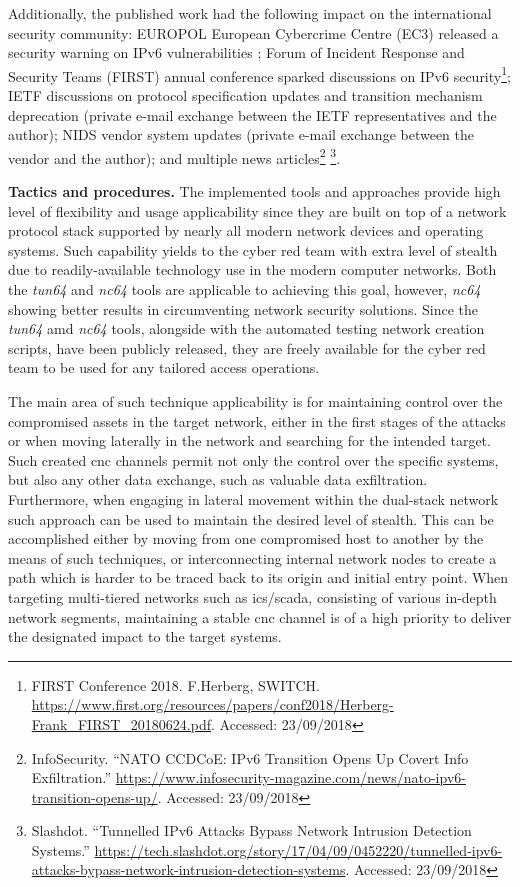 Additionally, the published work had the following impact on the international security community:
EUROPOL European Cybercrime Centre (EC3) released a security warning on IPv6 vulnerabilities \cite{EC3-2017-7};
Forum of Incident Response and Security Teams (FIRST) annual conference sparked discussions on IPv6 security\footnote{FIRST Conference 2018. F.Herberg, SWITCH. \url{https://www.first.org/resources/papers/conf2018/Herberg-Frank_FIRST_20180624.pdf}. Accessed: 23/09/2018};
IETF discussions on protocol specification updates and transition mechanism deprecation (private e-mail exchange between the IETF representatives and the author);
NIDS vendor system updates (private e-mail exchange between the vendor and the author);
and multiple news articles\footnote{InfoSecurity. ``NATO CCDCoE: IPv6 Transition Opens Up Covert Info Exfiltration.'' \url{https://www.infosecurity-magazine.com/news/nato-ipv6-transition-opens-up/}. Accessed: 23/09/2018} \footnote{Slashdot. ``Tunnelled IPv6 Attacks Bypass Network Intrusion Detection Systems.'' \url{https://tech.slashdot.org/story/17/04/09/0452220/tunnelled-ipv6-attacks-bypass-network-intrusion-detection-systems}. Accessed: 23/09/2018}.

\textbf{Tactics and procedures.}
The implemented tools and approaches provide high level of flexibility and usage applicability since they are built on top of a network protocol stack supported by nearly all modern network devices and operating systems. Such capability yields to the cyber red team with extra level of stealth due to readily-available technology use in the modern computer networks. Both the \textit{tun64} and \textit{nc64} tools are applicable to achieving this goal, however, \textit{nc64} showing better results in circumventing network security solutions. Since the \textit{tun64} amd \textit{nc64} tools, alongside with the automated testing network creation scripts, have been publicly released, they are freely available for the cyber red team to be used for any tailored access operations.

The main area of such technique applicability is for maintaining control over the compromised assets in the target network, either in the first stages of the attacks or when moving laterally in the network and searching for the intended target. Such created \gls{cnc} channels permit not only the control over the specific systems, but also any other data exchange, such as valuable data exfiltration. Furthermore, when engaging in lateral movement within the dual-stack network such approach can be used to maintain the desired level of stealth. This can be accomplished either by moving from one compromised host to another by the means of such techniques, or interconnecting internal network nodes to create a path which is harder to be traced back to its origin and initial entry point. When targeting multi-tiered networks such as \gls{ics}/\gls{scada}, consisting of various in-depth network segments, maintaining a stable \gls{cnc} channel is of a high priority to deliver the designated impact to the target systems.

